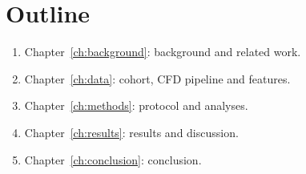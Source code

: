 \section{Outline}
\begin{enumerate}
    \item Chapter~\ref{ch:background}: background and related work.
    \item Chapter~\ref{ch:data}: cohort, CFD pipeline and features.
    \item Chapter~\ref{ch:methods}: protocol and analyses.
    \item Chapter~\ref{ch:results}: results and discussion.
    \item Chapter~\ref{ch:conclusion}: conclusion.
\end{enumerate}

